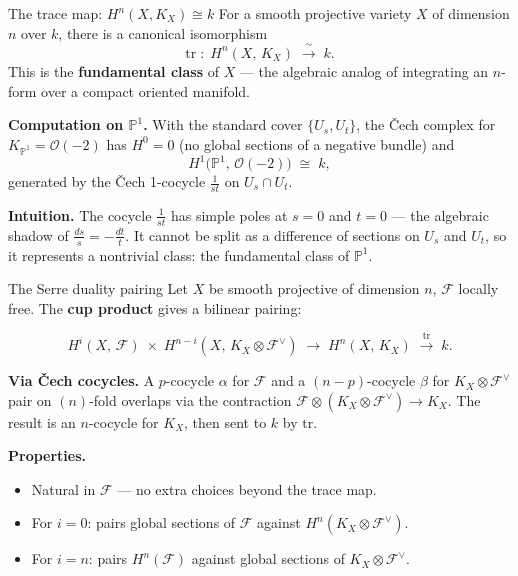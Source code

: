 \documentclass[aspectratio=169,12pt]{beamer}
\newenvironment{mathbox}{%
  \begin{tcolorbox}[mathbox]}{%
  \end{tcolorbox}}
\begin{document}
\begin{frame}{The trace map: $H^n(X, K_X) \cong k$}
  For a smooth projective variety $X$ of dimension $n$ over $k$,
  there is a canonical isomorphism
  \[
    \mathrm{tr} \;:\; H^n(X,\, K_X) \;\xrightarrow{\;\sim\;}\; k.
  \]
  This is the \textbf{fundamental class} of $X$ — the algebraic analog of
  integrating an $n$-form over a compact oriented manifold.

  \medskip

  \textbf{Computation on $\mathbb{P}^1$.}\enspace
  With the standard cover $\{U_s, U_t\}$, the Čech complex for
  $K_{\mathbb{P}^1} = \mathcal{O}(-2)$ has
  $H^0 = 0$ (no global sections of a negative bundle) and
  \[
    H^1\bigl(\mathbb{P}^1,\, \mathcal{O}(-2)\bigr) \;\cong\; k,
  \]
  generated by the Čech 1-cocycle $\tfrac{1}{st}$ on $U_s \cap U_t$.

  \medskip

  \textbf{Intuition.}\enspace
  The cocycle $\tfrac{1}{st}$ has simple poles at $s = 0$ and $t = 0$
  — the algebraic shadow of $\tfrac{ds}{s} = -\tfrac{dt}{t}$.
  It cannot be split as a difference of sections on $U_s$ and $U_t$,
  so it represents a nontrivial class: the fundamental class of $\mathbb{P}^1$.
\end{frame}

\begin{frame}{The Serre duality pairing}
  Let $X$ be smooth projective of dimension $n$, $\mathcal{F}$ locally free.
  The \textbf{cup product} gives a bilinear pairing:
  \begin{mathbox}
  \[
    H^i(X,\, \mathcal{F})
    \;\times\;
    H^{n-i}(X,\, K_X \otimes \mathcal{F}^\vee)
    \;\longrightarrow\;
    H^n(X,\, K_X)
    \;\xrightarrow{\;\mathrm{tr}\;}\; k.
  \]
  \end{mathbox}

  \textbf{Via Čech cocycles.}\enspace
  A $p$-cocycle $\alpha$ for $\mathcal{F}$ and a $(n-p)$-cocycle $\beta$ for
  $K_X \otimes \mathcal{F}^\vee$ pair on $(n)$-fold overlaps via
  the contraction $\mathcal{F} \otimes (K_X \otimes \mathcal{F}^\vee) \to K_X$.
  The result is an $n$-cocycle for $K_X$, then sent to $k$ by $\mathrm{tr}$.

  \medskip

  \textbf{Properties.}
  \begin{itemize}
    \item Natural in $\mathcal{F}$ — no extra choices beyond the trace map.
    \item For $i = 0$: pairs global sections of $\mathcal{F}$ against
          $H^n(K_X \otimes \mathcal{F}^\vee)$.
    \item For $i = n$: pairs $H^n(\mathcal{F})$ against global sections of
          $K_X \otimes \mathcal{F}^\vee$.
  \end{itemize}
\end{frame}
\end{document}
